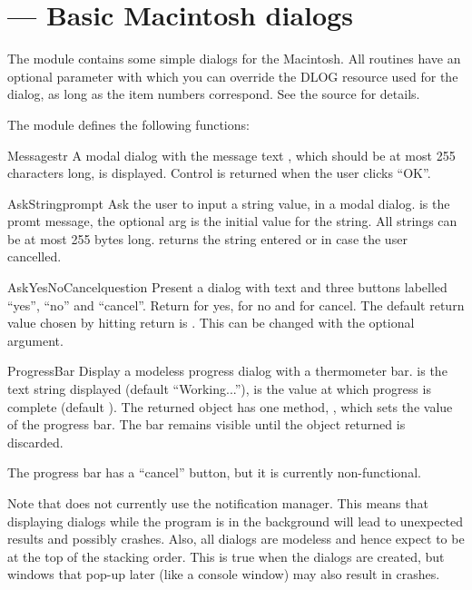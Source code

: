 \section{ ---
         Basic Macintosh dialogs}



The  module contains some simple dialogs for
the Macintosh.  All routines have an optional parameter  with
which you can override the DLOG resource used for the dialog, as long
as the item numbers correspond. See the source for details.

The  module defines the following functions:


\begin{funcdesc}{Message}{str}
A modal dialog with the message text , which should be at
most 255 characters long, is displayed. Control is returned when the
user clicks ``OK''.
\end{funcdesc}

\begin{funcdesc}{AskString}{prompt}
Ask the user to input a string value, in a modal dialog. 
is the promt message, the optional  arg is the initial
value for the string. All strings can be at most 255 bytes
long.  returns the string entered or 
in case the user cancelled.
\end{funcdesc}

\begin{funcdesc}{AskYesNoCancel}{question}
Present a dialog with text  and three buttons labelled
``yes'', ``no'' and ``cancel''. Return  for yes,  for
no and  for cancel. The default return value chosen by
hitting return is . This can be changed with the optional
 argument.
\end{funcdesc}

\begin{funcdesc}{ProgressBar}{}
Display a modeless progress dialog with a thermometer bar. 
is the text string displayed (default ``Working...''),  is
the value at which progress is complete (default ). The
returned object has one method, , which sets
the value of the progress bar. The bar remains visible until the
object returned is discarded.

The progress bar has a ``cancel'' button, but it is currently
non-functional.
\end{funcdesc}

Note that  does not currently use the notification
manager. This means that displaying dialogs while the program is in
the background will lead to unexpected results and possibly
crashes. Also, all dialogs are modeless and hence expect to be at the
top of the stacking order. This is true when the dialogs are created,
but windows that pop-up later (like a console window) may also result
in crashes.
